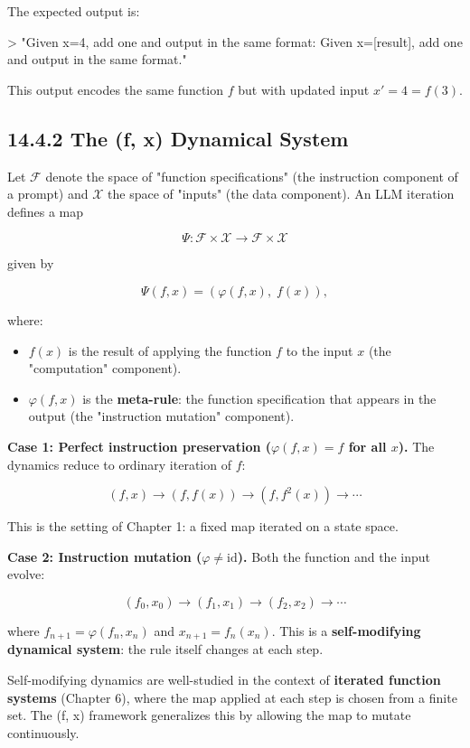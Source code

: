 The expected output is:

> "Given x=4, add one and output in the same format: Given x=[result], add one and output in the same format."

This output encodes the same function $f$ but with updated input $x' = 4 = f(3)$.

\subsection{14.4.2 The (f, x) Dynamical System}

\begin{definition}
Let $\mathcal{F}$ denote the space of "function specifications" (the instruction component of a prompt) and $\mathcal{X}$ the space of "inputs" (the data component). An LLM iteration defines a map

\[
\Psi: \mathcal{F} \times \mathcal{X} \to \mathcal{F} \times \mathcal{X}
\]

given by

\[
\Psi(f, x) = (\varphi(f, x), \; f(x)),
\]

where:
\end{definition}
\begin{itemize}
  \item $f(x)$ is the result of applying the function $f$ to the input $x$ (the "computation" component).
  \item $\varphi(f, x)$ is the \textbf{meta-rule}: the function specification that appears in the output (the "instruction mutation" component).
\end{itemize}

\textbf{Case 1: Perfect instruction preservation ($\varphi(f, x) = f$ for all $x$).} The dynamics reduce to ordinary iteration of $f$:

\[
(f, x) \to (f, f(x)) \to (f, f^2(x)) \to \cdots
\]

This is the setting of Chapter 1: a fixed map iterated on a state space.

\textbf{Case 2: Instruction mutation ($\varphi \neq \mathrm{id}$).} Both the function and the input evolve:

\[
(f_0, x_0) \to (f_1, x_1) \to (f_2, x_2) \to \cdots
\]

where $f_{n+1} = \varphi(f_n, x_n)$ and $x_{n+1} = f_n(x_n)$. This is a \textbf{self-modifying dynamical system}: the rule itself changes at each step.

\begin{remark}
Self-modifying dynamics are well-studied in the context of \textbf{iterated function systems} (Chapter 6), where the map applied at each step is chosen from a finite set. The (f, x) framework generalizes this by allowing the map to mutate continuously.
\end{remark}

